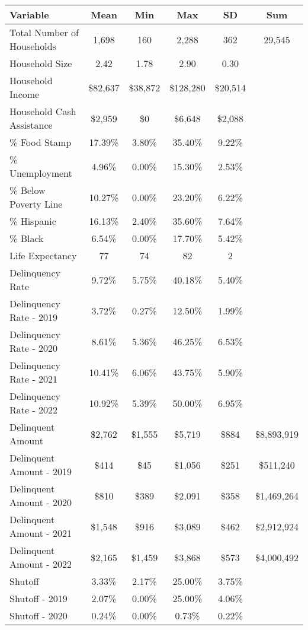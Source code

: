 \begin{tabular}{l|c|c|c|c|c}
\toprule 
\midrule 
Variable & Mean & Min & Max & SD & Sum \\
\midrule 
Total Number of Households & 1,698 & 160 & 2,288 & 362 & 29,545 \\
\quad Household Size & 2.42 & 1.78 & 2.90 & 0.30 \\
Household Income & \$82,637 & \$38,872 & \$128,280 & \$20,514 \\
\quad Household Cash Assistance & \$2,959 & \$0 & \$6,648 & \$2,088 \\
\% Food Stamp & 17.39\% & 3.80\% & 35.40\% & 9.22\% \\
\% Unemployment & 4.96\% & 0.00\% & 15.30\% & 2.53\% \\
\% Below Poverty Line & 10.27\% & 0.00\% & 23.20\% & 6.22\% \\
\% Hispanic & 16.13\% & 2.40\% & 35.60\% & 7.64\% \\
\% Black & 6.54\% & 0.00\% & 17.70\% & 5.42\% \\
Life Expectancy & 77 & 74 & 82 & 2 \\
\midrule 
Delinquency Rate & 9.72\% & 5.75\% & 40.18\% & 5.40\% \\
\quad Delinquency Rate - 2019 & 3.72\% & 0.27\% & 12.50\% & 1.99\% \\
\quad Delinquency Rate - 2020 & 8.61\% & 5.36\% & 46.25\% & 6.53\% \\
\quad Delinquency Rate - 2021 & 10.41\% & 6.06\% & 43.75\% & 5.90\% \\
\quad Delinquency Rate - 2022 & 10.92\% & 5.39\% & 50.00\% & 6.95\% \\
\midrule 
Delinquent Amount & \$2,762 & \$1,555 & \$5,719 & \$884 & \$8,893,919 \\
\quad Delinquent Amount - 2019 & \$414 & \$45 & \$1,056 & \$251 & \$511,240 \\
\quad Delinquent Amount - 2020 & \$810 & \$389 & \$2,091 & \$358 & \$1,469,264 \\
\quad Delinquent Amount - 2021 & \$1,548 & \$916 & \$3,089 & \$462 & \$2,912,924 \\
\quad Delinquent Amount - 2022 & \$2,165 & \$1,459 & \$3,868 & \$573 & \$4,000,492 \\
\midrule 
Shutoff & 3.33\% & 2.17\% & 25.00\% & 3.75\% \\
\quad Shutoff - 2019 & 2.07\% & 0.00\% & 25.00\% & 4.06\% \\
\quad Shutoff - 2020 & 0.24\% & 0.00\% & 0.73\% & 0.22\% \\

\end{tabular}
